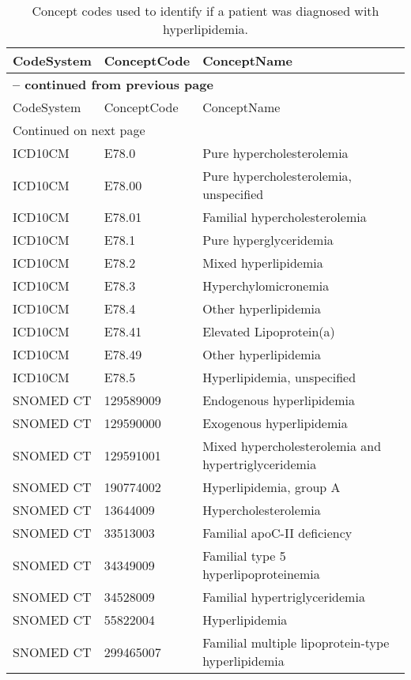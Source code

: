 \begin{longtable}{p{}p{}p{}}
\caption{Concept codes used to identify if a patient was diagnosed with hyperlipidemia.} \\ 
 CodeSystem & ConceptCode & ConceptName \\ 
  \hline 
\endfirsthead 
\multicolumn{3}{p{\textwidth}}{{ \bfseries \tablename \thetable{} -- continued from previous page}} \\ 
\hline CodeSystem & ConceptCode & ConceptName \\ \hline 
\endhead 
\hline \multicolumn{3}{p{\textwidth}}{{Continued on next page}} \\ \hline 
\endfoot 
\hline 
\endlastfoot 
 \hline
ICD10CM & E78.0 & Pure hypercholesterolemia \\ 
  ICD10CM & E78.00 & Pure hypercholesterolemia, unspecified \\ 
  ICD10CM & E78.01 & Familial hypercholesterolemia \\ 
  ICD10CM & E78.1 & Pure hyperglyceridemia \\ 
  ICD10CM & E78.2 & Mixed hyperlipidemia \\ 
  ICD10CM & E78.3 & Hyperchylomicronemia \\ 
  ICD10CM & E78.4 & Other hyperlipidemia \\ 
  ICD10CM & E78.41 & Elevated Lipoprotein(a) \\ 
  ICD10CM & E78.49 & Other hyperlipidemia \\ 
  ICD10CM & E78.5 & Hyperlipidemia, unspecified \\ 
  SNOMED CT & 129589009 & Endogenous hyperlipidemia \\ 
  SNOMED CT & 129590000 & Exogenous hyperlipidemia \\ 
  SNOMED CT & 129591001 & Mixed hypercholesterolemia and hypertriglyceridemia \\ 
  SNOMED CT & 190774002 & Hyperlipidemia, group A \\ 
  SNOMED CT & 13644009 & Hypercholesterolemia \\ 
  SNOMED CT & 33513003 & Familial apoC-II deficiency \\ 
  SNOMED CT & 34349009 & Familial type 5 hyperlipoproteinemia \\ 
  SNOMED CT & 34528009 & Familial hypertriglyceridemia \\ 
  SNOMED CT & 55822004 & Hyperlipidemia \\ 
  SNOMED CT & 299465007 & Familial multiple lipoprotein-type hyperlipidemia \\ 

\end{longtable}
